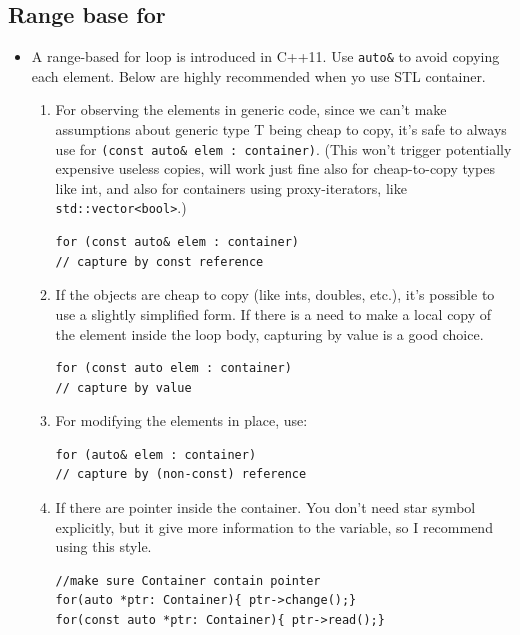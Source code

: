 \documentclass[a4paper,11pt,twoside]{book}
\begin{document}
\subsection{Range base for}
\begin{itemize}
	
	\item A range-based for loop is introduced in C++11. Use \texttt{auto\&} to avoid copying each element. Below are highly recommended when yo use STL container.
	
	\begin{enumerate}
		\item  For observing the elements in generic code, since we can't make assumptions about generic type T being cheap to copy, it's safe to always use for \texttt{(const auto\& elem : container)}.  (This won't trigger potentially expensive useless copies, will work just fine also for cheap-to-copy types like int, and also for containers using proxy-iterators, like \texttt{std::vector<bool>}.)
\begin{lstlisting}[numbers=none]
for (const auto& elem : container)    
// capture by const reference
\end{lstlisting}	
		
		
		\item If the objects are cheap to copy (like ints, doubles, etc.), it's possible to use a slightly simplified form. If there is a need to make a local copy of the element inside the loop body, capturing by value is a good choice.
		
\begin{lstlisting}[numbers=none]
for (const auto elem : container)   
// capture by value
\end{lstlisting}            
		
		\item For modifying the elements in place, use:
\begin{lstlisting}[numbers=none]
for (auto& elem : container)    
// capture by (non-const) reference
\end{lstlisting}
		
		\item If there are pointer inside the container. You don't need star symbol explicitly, but it give more information to the variable, so I recommend using this style.
\begin{lstlisting}[numbers=none]
//make sure Container contain pointer
for(auto *ptr: Container){ ptr->change();}
for(const auto *ptr: Container){ ptr->read();}
\end{lstlisting}
		

\end{enumerate}
\end{itemize}
\end{document}

